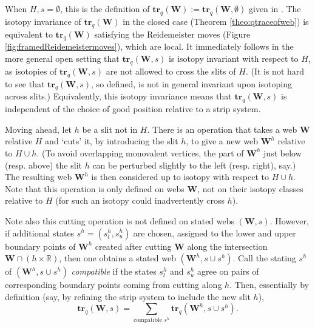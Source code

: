 \documentclass[12pt, reqno]{amsart}
\theoremstyle{definition}
\newcommand{\R}{\mathbb{R}}%
\newcommand{\trq}{\mathbf{tr}_q}%
\begin{document}
When $H,s=\emptyset$, this is the definition of $\trq(\mathbf{W}):=\trq(\mathbf{W},\emptyset)$ given in \cite{sikora1}.  The isotopy invariance of $\trq(\mathbf{W})$ in the closed case (Theorem \ref{theo:qtraceofweb}) is equivalent to $\trq(\mathbf{W})$ satisfying the Reidemeister moves (Figure \ref{fig:framedReidemeistermoves}), which are local.  It immediately follows in the more general open setting that $\trq(\mathbf{W},s)$ is isotopy invariant with respect to $H$, as isotopies of $\trq(\mathbf{W},s)$ are not allowed to cross the slits of $H$.  (It is not hard to see that $\trq(\mathbf{W},s)$, so defined, is not in general invariant upon isotoping across slits.)  Equivalently, this isotopy invariance means that $\trq(\mathbf{W},s)$ is independent of the choice of good position relative to a strip system.  

Moving ahead, let $h$ be a slit not in $H$.  There is an operation that takes a web $\mathbf{W}$ relative $H$ and `cuts' it, by introducing the slit $h$, to give a new web $\mathbf{W}^h$ relative to $H\cup h$.  (To avoid overlapping monovalent vertices, the part of $\mathbf{W}^h$ just below (resp. above) the slit $h$ can be perturbed slightly to the left (resp. right), say.)  The resulting web $\mathbf{W}^h$ is then considered up to isotopy with respect to $H\cup h$.  Note that this operation is only defined on webs $\mathbf{W}$, not on their isotopy classes relative to $H$ (for such an isotopy could inadvertently cross $h$).    

Note also this cutting operation is not defined on stated webs $(\mathbf{W},s)$.  However, if additional states $s^h=(s_l^h, s_u^h)$ are chosen, assigned to the lower and upper boundary points of $\mathbf{W}^h$ created after cutting $\mathbf{W}$ along the intersection $\mathbf{W}\cap (h\times\R)$, then one obtains a stated web $(\mathbf{W}^h,s\cup s^h)$.  Call the stating $s^h$ of $(\mathbf{W}^h,s\cup s^h)$ \emph{compatible} if the states $s_l^h$ and $s_u^h$ agree on pairs of corresponding boundary points coming from cutting along $h$. Then, essentially by definition (say, by refining the strip system to include the new slit $h$), 
$$
\trq(\mathbf{W},s)=\sum_{\text{compatible }s^h}\trq(\mathbf{W}^h,s\cup s^h).
$$  
\end{document}
